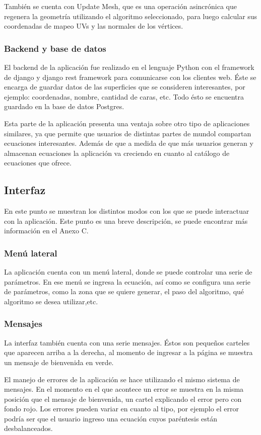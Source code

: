 \documentclass[12pt]{article}
\begin{document}
También se cuenta con Update Mesh, que es una operación asincrónica que regenera la geometría utilizando el algoritmo seleccionado, para luego calcular sus coordenadas de mapeo UVs y las normales de los vértices.
\subsubsection{Backend y base de datos}
El backend de la aplicación fue realizado en el lenguaje Python con el framework de django y django rest framework para comunicarse con los clientes web. Éste se encarga de guardar datos de las superficies que se consideren interesantes, por ejemplo: coordenadas, nombre, cantidad de caras, etc. Todo ésto se encuentra guardado en la base de datos Postgres.

Esta parte de la aplicación presenta una ventaja sobre otro tipo de aplicaciones similares, ya que permite que usuarios de distintas partes de mundol compartan ecuaciones interesantes. Además de que a medida de que más usuarios generan y almacenan ecuaciones la aplicación va creciendo en cuanto al catálogo de ecuaciones que ofrece.
\clearpage
\subsection{Interfaz}
En este punto se muestran los distintos modos con los que se puede interactuar con la aplicación. Este punto es una breve descripción, se puede encontrar más información en el Anexo C.
\subsubsection{Menú lateral}
La aplicación cuenta con un menú lateral, donde se puede controlar una serie de parámetros. En ese menú se ingresa la ecuación, así como se configura una serie de parámetros, como la zona que se quiere generar, el paso del algoritmo, qué algoritmo se desea utilizar,etc. 
\subsubsection{Mensajes}
La interfaz también cuenta con una serie mensajes. Éstos son pequeños carteles que aparecen arriba a la derecha, al momento de ingresar a la página se muestra un mensaje de bienvenida en verde. 

El manejo de errores de la aplicación se hace utilizando el mismo sistema de mensajes. En el momento en el que acontece un error se muestra en la misma posición que el mensaje de bienvenida, un cartel explicando el error pero con fondo rojo. Los errores pueden variar en cuanto al tipo, por ejemplo el error podría ser que el usuario ingreso una ecuación cuyos paréntesis están desbalanceados.
\end{document}
